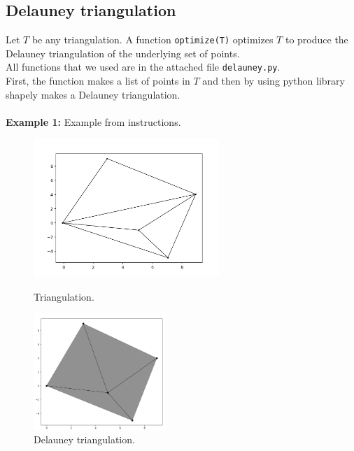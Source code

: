 \documentclass[a4paper,11pt]{article}
\begin{document}
\newpage
\subsection{Delauney triangulation}

Let $T$ be any triangulation. A function \texttt{optimize(T)} optimizes $T$ to produce the Delauney triangulation of the underlying set of points.
\\
All functions that we used are in the attached file \texttt{delauney.py}.
\\
First, the function makes a list of points in $T$ and then by using python library shapely makes a Delauney triangulation.
\\
\\
\textbf{Example 1:} Example from instructions.
\begin{figure}[ht!]
    \begin{minipage}{0.5\textwidth}
        \centering
        \includegraphics[width=70mm]{prim_h.png}
        \caption{Triangulation.}
    \end{minipage}\hfill
    \begin{minipage}{0.5\textwidth}
        \centering
        \includegraphics[width=50mm]{del.png}
        \caption{Delauney triangulation.}
    \end{minipage}\hfill
\end{figure}
\end{document}
